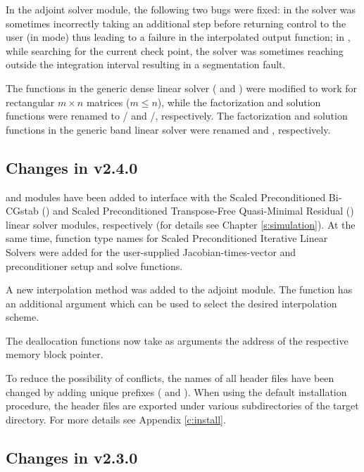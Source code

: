 In the adjoint solver module, the following two bugs were fixed: in 
the solver was sometimes incorrectly taking an additional step before
returning control to the user (in  mode) thus leading to 
a failure in the interpolated output function; in , while searching
for the current check point, the solver was sometimes reaching outside the
integration interval resulting in a segmentation fault.

The functions in the generic dense linear solver ( and
) were modified to work for rectangular $m \times n$
matrices ($m \le n$), while the factorization and solution functions were
renamed to / and /, 
respectively.
The factorization and solution functions in the generic band linear solver were 
renamed  and , respectively.

\subsection*{Changes in v2.4.0}

{\cvspbcg} and {\cvsptfqmr} modules have been added to interface with the
Scaled Preconditioned Bi-CGstab ({\spbcg}) and Scaled Preconditioned
Transpose-Free Quasi-Minimal Residual ({\sptfqmr}) linear solver modules,
respectively (for details see Chapter \ref{s:simulation}).
At the same time, function type names for Scaled Preconditioned Iterative
Linear Solvers were added for the user-supplied Jacobian-times-vector and
preconditioner setup and solve functions.

A new interpolation method was added to the {\cvodes} adjoint module. The
function  has an additional argument which can be used to select
the desired interpolation scheme.

The deallocation functions now take as arguments the address of the respective 
memory block pointer.

To reduce the possibility of conflicts, the names of all header files have
been changed by adding unique prefixes ( and ).
When using the default installation procedure, the header files are exported
under various subdirectories of the target  directory. For more
details see Appendix \ref{c:install}.

\subsection*{Changes in v2.3.0}

